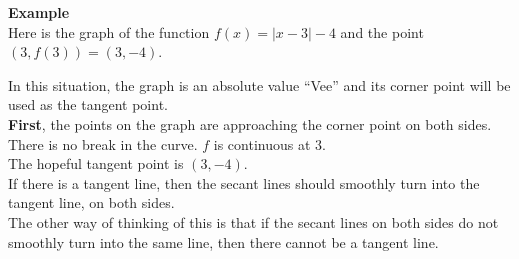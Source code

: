 \documentclass{ximera}
\begin{document}
\textbf{\textcolor{blue!55!black}{Example}}  \\




Here is the graph of the function $f(x) = | x - 3 | - 4$ and the point $(3, f(3))= (3, -4)$. \\

\begin{image}
\end{image}

In this situation, the graph is an absolute value ``Vee'' and its corner point will be used as the tangent point. \\


\textbf{First}, the points on the graph are approaching the corner point on both sides.  There is no break in the curve. $f$ is continuous at $3$.\\


The hopeful tangent point is $(3, -4)$. \\


If there is a tangent line, then the secant lines should smoothly turn into the tangent line, on both sides.  \\


The other way of thinking of this is that if the secant lines on both sides do not smoothly turn into the same line, then there cannot be a tangent line. \\
\end{document}
